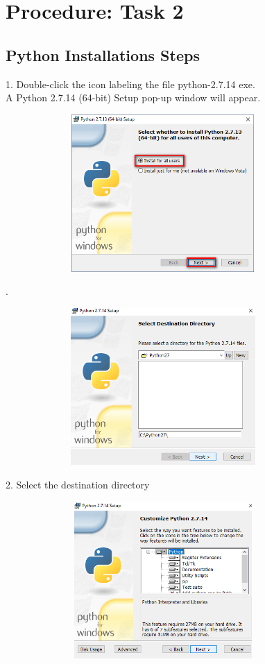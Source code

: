 \documentclass[11pt]{article}            %
\begin{document}
\section{Procedure: Task 2 }   
  
\subsection{Python Installations Steps }  

1. Double-click the icon labeling the file python-2.7.14 exe.\\ A Python 2.7.14 (64-bit) Setup pop-up window will appear. 


\begin{center}
  \includegraphics[width=12cm,height=6cm,keepaspectratio]{2.png}\\ 

\end{center} 
.
\begin{center} 
  \includegraphics[width=12cm,height=6cm,keepaspectratio]{7.png}\\

\end{center}

2. Select the destination directory\\ 


\begin{center}
  \includegraphics[width=12cm,height=6cm,keepaspectratio]{5.png}\\
\end{center}
\end{document}
